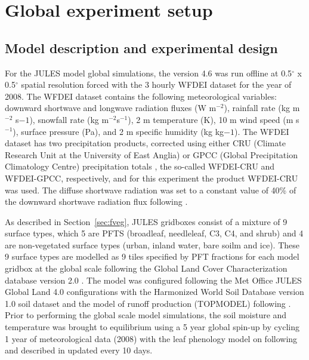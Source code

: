 \section{Global experiment setup}

\subsection{Model description and experimental design}

For the JULES model global simulations, the version 4.6 was run offline at 0.5$^{\circ}$ x 0.5$^{\circ}$ spatial resolution forced with the 3 hourly WFDEI dataset \citep{Weedon2014} for the year of 2008. The WFDEI dataset contains the following meteorological variables: downward shortwave and longwave radiation fluxes (W m$^{-2}$), rainfall rate (kg m$^{-2}$ s${-1}$), snowfall rate (kg m$^{-2}$s$^{-1}$), 2 m temperature (K), 10 m wind speed (m s$^{-1}$), surface pressure (Pa), and 2 m specific humidity (kg kg${-1}$). The WFDEI dataset has two precipitation products, corrected using either CRU (Climate Research Unit at the University of East Anglia) or GPCC (Global Precipitation Climatology Centre) precipitation totals \citep{Weedon2014}, the so-called WFDEI-CRU and WFDEI-GPCC, respectively, and for this experiment the product WFDEI-CRU was used. The diffuse shortwave radiation was set to a constant value of 40\% of the downward shortwave radiation flux following \citet{Harper2016}.

As described in Section~\ref{sec:fveg}, JULES gridboxes consist of a mixture of 9 surface types, which 5 are PFTS (broadleaf, needleleaf, C3, C4, and shrub) and 4 are non-vegetated surface types (urban, inland water, bare soilm and ice). These 9 surface types are modelled as 9 tiles specified by PFT fractions for each model gridbox at the global scale following the Global Land Cover Characterization database version 2.0 \citep{Loveland2000}. The model was configured following the Met Office JULES Global Land 4.0 configurations \citep{Walters2014} with the Harmonized World Soil Database version 1.0 soil dataset \citep{Nachtergaele2008} and the model of runoff production (TOPMODEL) following \citet{Clark2008}. Prior to performing the global scale model simulations, the soil moisture and temperature was brought to equilibrium using a 5 year global spin-up by cycling 1 year of meteorological data (2008) with the leaf phenology model on following \citet{Cox2001} and described in \citet{Clark2011} updated every 10 days.

